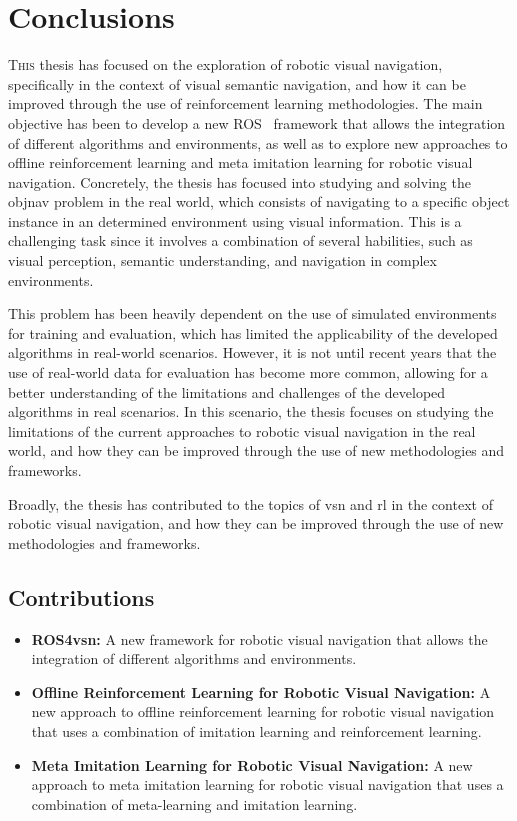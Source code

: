 \chapter{Conclusions}\label{ch:conclusions}

\lettrine{\textcolor{accent_color}{T}}{his} thesis has focused on the exploration of robotic visual navigation, specifically in the context of visual semantic navigation, and how it can be improved through the use of reinforcement learning methodologies.
The main objective has been to develop a new ROS~\cite{ros} framework that allows the integration of different algorithms and environments, as well as to explore new approaches to offline reinforcement learning and meta imitation learning for robotic visual navigation.
Concretely, the thesis has focused into studying and solving the \acrshort{objnav} problem in the real world, which consists of navigating to a specific object instance in an determined environment using visual information.
This is a challenging task since it involves a combination of several habilities, such as visual perception, semantic understanding, and navigation in complex environments.

This problem has been heavily dependent on the use of simulated environments for training and evaluation, which has limited the applicability of the developed algorithms in real-world scenarios.
However, it is not until recent years that the use of real-world data for evaluation has become more common, allowing for a better understanding of the limitations and challenges of the developed algorithms in real scenarios.
In this scenario, the thesis focuses on studying the limitations of the current approaches to robotic visual navigation in the real world, and how they can be improved through the use of new methodologies and frameworks.

Broadly, the thesis has contributed to the topics of \acrfull{vsn} and \acrshort{rl} in the context of robotic visual navigation, and how they can be improved through the use of new methodologies and frameworks.


\section{Contributions}\label{sec:contributions}
\begin{itemize}
    \item \textbf{ROS4\acrshort{vsn}:} A new framework for robotic visual navigation that allows the integration of different algorithms and environments.
    \item \textbf{Offline Reinforcement Learning for Robotic Visual Navigation:} A new approach to offline reinforcement learning for robotic visual navigation that uses a combination of imitation learning and reinforcement learning.
    \item \textbf{Meta Imitation Learning for Robotic Visual Navigation:} A new approach to meta imitation learning for robotic visual navigation that uses a combination of meta-learning and imitation learning.
\end{itemize}


